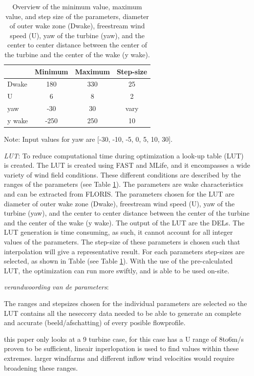 \begin{table}[h]
	\caption{Overview of the minimum value, maximum value, and step size of the parameters, diameter of outer wake zone (Dwake), freestream wind speed (U), yaw of the turbine (yaw), and the center to center distance between the center of the turbine and the center of the wake (y wake).}
	\centering
	\label{tab:pars}
	\begin{tabular}{lccc}
		\hline
	 	& Minimum & Maximum & Step-size \\ 
		\hline
		Dwake & 180 & 330 & 25 \\
		U & 6 & 8 & 2 \\
		yaw & -30 & 30 & vary \\
		y wake & -250 & 250 & 10 \\
		\hline
	\end{tabular}
Note: Input values for yaw are [-30, -10, -5, 0, 5, 10, 30].
\end{table}

\textit{LUT}: To reduce computational time during optimization a look-up table (LUT) is created. The LUT is created using FAST and MLife, and it encompasses a wide variety of wind field conditions. 
These different conditions are described by the ranges of the parameters (see Table \ref{tab:pars}). The parameters are wake characteristics and can be extracted from FLORIS. The parameters chosen for the LUT are diameter of outer wake zone (Dwake), freestream wind speed (U), yaw of the turbine (yaw), and the center to center distance between the center of the turbine and the center of the wake (y wake). The output of the LUT are the DELs. The LUT generation is time consuming, as such, it cannot account for all integer values of the parameters. The step-size of these parameters is chosen such that interpolation will give a representative result. For each parameters step-sizes are selected, as shown in Table (see Table \ref{tab:pars}). With the use of the pre-calculated LUT, the optimization can run more swiftly, and is able to be used on-site.

\textit{verandwoording van de parameters}:

The ranges and stepsizes chosen for the individual parameters are selected so the LUT contains all the neseccery data needed to be able to generate an complete and accurate (beeld/afschatting) of every posible flowprofile.

this paper only looks at a 9 turbine case, for this case has a U range of 8to6m/s proven to be sufficient, lineair inperlopation is used to find values within these extremes. larger windfarms and different inflow wind velocities would require broadening these ranges.

